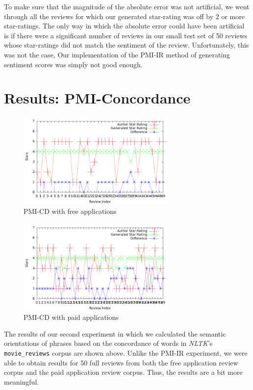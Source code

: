 \documentclass[11pt]{report} %
\begin{document}
To make sure that the magnitude of the absolute error was not artificial, we went through all the reviews for which our generated star-rating was off by 2 or more star-ratings. The only way in which the absolute error could have been artificial is if there were a significant number of reviews in our small test set of 50 reviews whose star-ratings did not match the sentiment of the review. Unfortunately, this was not the case, Our implementation of the PMI-IR method of generating sentiment scores was simply not good enough.

	\section{Results: PMI-Concordance}
	
	\begin{figure}[H]
	\centering
	\includegraphics[width=0.7\textwidth]{data/pmi-cd-free.pdf}
	\caption{PMI-CD with free applications}
	\label{fig:pmi-cd-free}
	\end{figure}

	\begin{figure}[H]
	\centering
	\includegraphics[width=0.7\textwidth]{data/pmi-cd-paid.pdf}
	\caption{PMI-CD with paid applications}
	\label{fig:pmi-cd-paid}
	\end{figure}

The results of our second experiment in which we calculated the semantic orientations of phrases based on the concordance of words in \textit{NLTK}'s \verb|movie_reviews| corpus are shown above. Unlike the PMI-IR experiment, we were able to obtain results for 50 full reviews from both the free application review corpus and the paid application review corpus. Thus, the results are a bit more meaningful.
\end{document}

